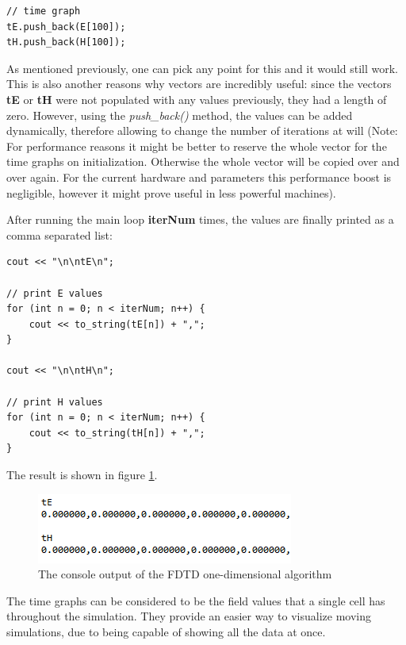 \begin{verbatim}
// time graph
tE.push_back(E[100]);
tH.push_back(H[100]);
\end{verbatim}

As mentioned previously, one can pick any point for this and it would still work. This is also another reasons why vectors are incredibly useful: since the vectors \textbf{tE} or \textbf{tH} were not populated with any values previously, they had a length of zero. However, using the \textit{push\_back()} method, the values can be added dynamically, therefore allowing to change the number of iterations at will (Note: For performance reasons it might be better to reserve the whole vector for the time graphs on initialization. Otherwise the whole vector will be copied over and over again. For the current hardware and parameters this performance boost is negligible, however it might prove useful in less powerful machines). 

After running the main loop \textbf{iterNum} times, the values are finally printed as a comma separated list:

\begin{verbatim}
cout << "\n\ntE\n";

// print E values
for (int n = 0; n < iterNum; n++) {
	cout << to_string(tE[n]) + ",";
}

cout << "\n\ntH\n";

// print H values
for (int n = 0; n < iterNum; n++) {
	cout << to_string(tH[n]) + ",";
}
\end{verbatim}

The result is shown in figure \ref{fig:fdtd1dconsole}.

\begin{figure}[h!]
	\centering
	\includegraphics{Figures/fdtd1dconsole}
	\decoRule
	\caption[1D Console Output]{The console output of the FDTD one-dimensional algorithm}
	\label{fig:fdtd1dconsole}
\end{figure}

The time graphs can be considered to be the field values that a single cell has throughout the simulation. They provide an easier way to visualize moving simulations, due to being capable of showing all the data at once.

